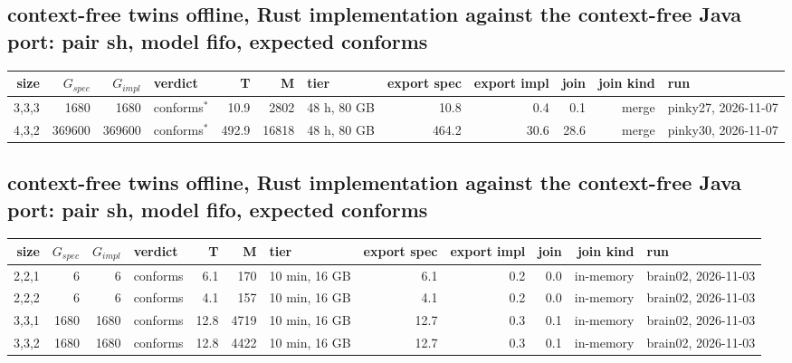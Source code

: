 \documentclass[10pt]{article}
\begin{document}
\subsection*{context-free twins offline, Rust implementation against the context-free Java port: pair \textsf{sh}, model fifo, expected conforms}
\begin{longtable}{@{}rrrlrrlrrrrl@{}}
\toprule
size & $G_{\mathit{spec}}$ & $G_{\mathit{impl}}$ & verdict & T & M & tier & export spec & export impl & join & join kind & run \\
\midrule
\endhead
\color{red} 3,3,3 & 1680 & 1680 & conforms$^{\ast}$ & 10.9 & 2802 & 48 h, 80 GB & 10.8 & 0.4 & 0.1 & merge & pinky27, 2026-11-07 \\
\color{red} 4,3,2 & 369600 & 369600 & conforms$^{\ast}$ & 492.9 & 16818 & 48 h, 80 GB & 464.2 & 30.6 & 28.6 & merge & pinky30, 2026-11-07 \\
\bottomrule
\end{longtable}
\subsection*{context-free twins offline, Rust implementation against the context-free Java port: pair \textsf{sh}, model fifo, expected conforms}
\begin{longtable}{@{}rrrlrrlrrrrl@{}}
\toprule
size & $G_{\mathit{spec}}$ & $G_{\mathit{impl}}$ & verdict & T & M & tier & export spec & export impl & join & join kind & run \\
\midrule
\endhead
\color{red} 2,2,1 & 6 & 6 & conforms & 6.1 & 170 & 10 min, 16 GB & 6.1 & 0.2 & 0.0 & in-memory & brain02, 2026-11-03 \\
\color{red} 2,2,2 & 6 & 6 & conforms & 4.1 & 157 & 10 min, 16 GB & 4.1 & 0.2 & 0.0 & in-memory & brain02, 2026-11-03 \\
\color{red} 3,3,1 & 1680 & 1680 & conforms & 12.8 & 4719 & 10 min, 16 GB & 12.7 & 0.3 & 0.1 & in-memory & brain02, 2026-11-03 \\
\color{red} 3,3,2 & 1680 & 1680 & conforms & 12.8 & 4422 & 10 min, 16 GB & 12.7 & 0.3 & 0.1 & in-memory & brain02, 2026-11-03 \\
\bottomrule
\end{longtable}
\end{document}
